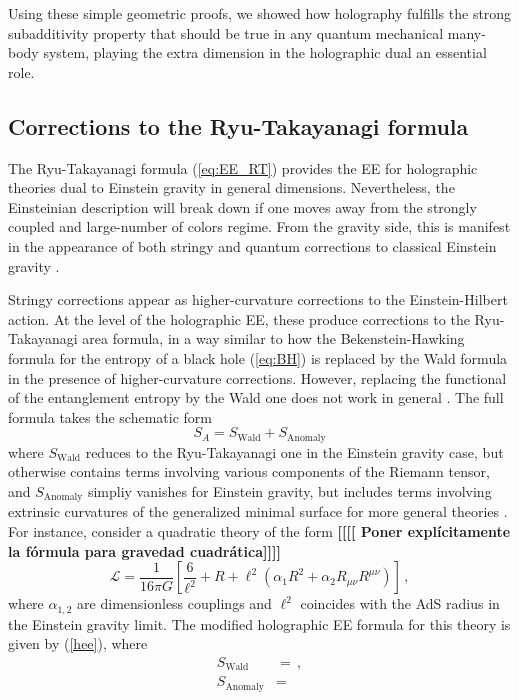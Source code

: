 \documentclass[twocolumn]{revtex4}
\begin{document}
Using these simple geometric proofs, we showed how holography fulfills the strong subadditivity property that should be true in any quantum mechanical many-body system, playing the extra dimension in the holographic dual an essential role.



\subsection{Corrections to the Ryu-Takayanagi formula} \label{ss:EE_HO}

The Ryu-Takayanagi formula (\ref{eq:EE_RT}) provides the EE for holographic theories dual to Einstein gravity in general dimensions. Nevertheless, the Einsteinian description will break down if one moves away from the strongly coupled and large-number of colors regime. From the gravity side, this is manifest in the appearance of both stringy and quantum corrections to classical Einstein gravity \cite{bueno_holographic_2021}.

Stringy corrections appear as higher-curvature corrections to the Einstein-Hilbert action. At the level of the holographic EE, these produce corrections to the Ryu-Takayanagi area formula, in a way similar to 
how the Bekenstein-Hawking formula for the entropy of a black hole (\ref{eq:BH}) is replaced by the Wald formula \cite{iyer_properties_1994} in the presence of higher-curvature corrections. However, replacing the functional of the entanglement entropy by the Wald one does not work in general \cite{bueno_holographic_2021}. The full formula takes the schematic form
\begin{equation}\label{hee}
    S_A=S_{\text{Wald}}+ S_{\text{Anomaly}}
\end{equation}
where $S_{\text{Wald}}$ reduces to the Ryu-Takayanagi one in the Einstein gravity case, but otherwise contains terms involving various components of the Riemann tensor, and $S_{\text{Anomaly}}$ simpliy vanishes for Einstein gravity, but includes terms involving extrinsic curvatures of the generalized minimal surface for more general theories \cite{dong_holographic_2014}. For instance, consider a quadratic theory of the form {\bf [[[[ Poner explícitamente la fórmula para gravedad cuadrática]]]]}
\begin{equation}
    \mathcal{L}= \frac{1}{16\pi G}\left[\frac{6}{\ell^ 2}+R+\ell^2 \left(\alpha_1 R^ 2 + \alpha_2 R_{\mu\nu} R^{\mu\nu}\right) \right]\, ,
\end{equation}
where $\alpha_{1,2}$ are dimensionless couplings and $\ell^2$ coincides with the AdS radius in the Einstein gravity limit.
The modified holographic EE formula for this theory is given by (\ref{hee}), where
\begin{align}
    S_{\text{Wald}}&= \, , \\
    S_{\text{Anomaly}}&=
\end{align}
\end{document}
